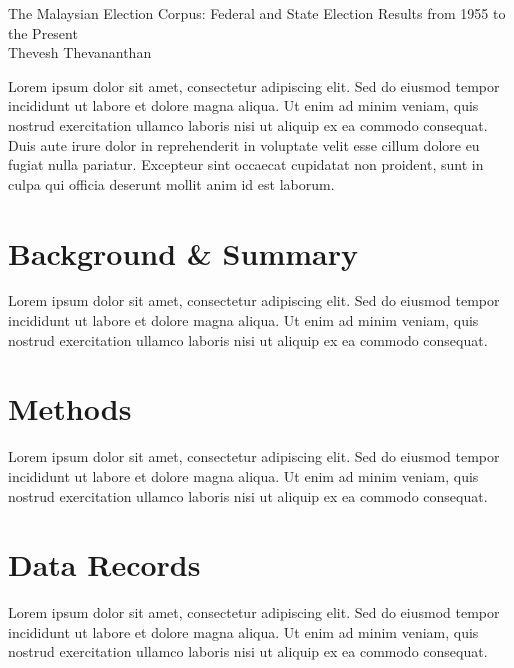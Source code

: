 \documentclass[11pt]{article}
\begin{document}

\phantom{Thevesh}

\vfill

\begin{center}
	\begin{minipage}{0.88\linewidth}
		\begin{center}
			\LARGE
			The Malaysian Election Corpus: Federal and State Election Results from 1955 to the Present\\[0.21in]
			\Large
			Thevesh Thevananthan\\[0.15in]  %
		\end{center}
		\large 
		Lorem ipsum dolor sit amet, consectetur adipiscing elit. Sed do eiusmod tempor incididunt ut labore et dolore magna aliqua. Ut enim ad minim veniam, quis nostrud exercitation ullamco laboris nisi ut aliquip ex ea commodo consequat. Duis aute irure dolor in reprehenderit in voluptate velit esse cillum dolore eu fugiat nulla pariatur. Excepteur sint occaecat cupidatat non proident, sunt in culpa qui officia deserunt mollit anim id est laborum.
	\end{minipage}
\end{center}

\vfill

\phantom{Word Count:}

\newpage
{}


\section*{Background \& Summary}
Lorem ipsum dolor sit amet, consectetur adipiscing elit. Sed do eiusmod tempor incididunt ut labore et dolore magna aliqua. Ut enim ad minim veniam, quis nostrud exercitation ullamco laboris nisi ut aliquip ex\cite{ge00report} ea commodo consequat.

\section*{Methods}
Lorem ipsum dolor sit amet, consectetur adipiscing elit. Sed do eiusmod tempor incididunt ut labore et dolore magna aliqua. Ut enim ad minim veniam, quis nostrud exercitation ullamco laboris nisi ut aliquip ex ea commodo consequat.

\section*{Data Records}
Lorem ipsum dolor sit amet, consectetur adipiscing elit. Sed do eiusmod tempor incididunt ut labore et dolore magna aliqua. Ut enim ad minim veniam, quis nostrud exercitation ullamco laboris nisi ut aliquip ex ea commodo consequat.
\end{document}
